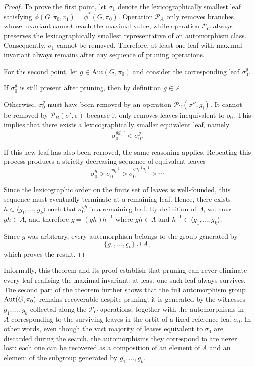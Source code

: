 \begin{proof}
  To prove the first point, let $\sigma_1$ denote the lexicographically smallest leaf satisfying $\phi(G,\pi_0,v_1)=\phi^*(G,\pi_0)$.
  Operation $\mathcal{P}_A$ only removes branches whose invariant cannot reach the maximal value, while operation $\mathcal{P}_C$ always preserves the lexicographically smallest representative of an automorphism class. Consequently, $\sigma_1$ cannot be removed. Therefore, at least one leaf with maximal invariant always remains after any sequence of pruning operations.
  
  For the second point, let $g\in\mathrm{Aut}(G,\pi_0)$ and consider the corresponding leaf $\sigma_0^g$.
  
  If $\sigma_0^g$ is still present after pruning, then by definition $g\in A$.
  
  Otherwise, $\sigma_0^g$ must have been removed by an operation $\mathcal{P}_C(\sigma'',g_i)$. It cannot be removed by $\mathcal{P}_B(\sigma', \sigma)$ because it only removes leaves inequivalent to $\sigma_0$. This implies that there exists a lexicographically smaller equivalent leaf, namely
  \[
  \sigma_0^{gg_i^{-1}}<\sigma_0^g.
  \]
  
  If this new leaf has also been removed, the same reasoning applies. Repeating this process produces a strictly decreasing sequence of equivalent leaves
  \[
  \sigma_0^g >
  \sigma_0^{gg_i^{-1}} >
  \sigma_0^{gg_i^{-1}g_j^{-1}} >
  \cdots
  \]
  
  Since the lexicographic order on the finite set of leaves is well-founded, this sequence must eventually terminate at a remaining leaf. Hence, there exists $h\in\langle g_1,\ldots,g_k\rangle$
  such that $\sigma_0^{gh}$ is a remaining leaf. By definition of $A$, we have $gh\in A$, and therefore $ g=(gh)h^{-1}$ where $gh\in A$ and $h^{-1}\in\langle g_1,\ldots,g_k\rangle$.
  
  Since $g$ was arbitrary, every automorphism belongs to the group generated by
  \[
  \{g_1,\ldots,g_k\}\cup A,
  \]
  which proves the result.
  \end{proof}

Informally, this theorem and its proof establish that pruning can never eliminate every leaf realising the maximal invariant: at least one such leaf always survives. The second part of the theorem further shows that the full automorphism group $\operatorname{Aut}(G,\pi_0)$ remains recoverable despite pruning: it is generated by the witnesses $g_1,\ldots,g_k$ collected along the $\mathcal{P}_C$ operations, together with the automorphisms in $A$ corresponding to the surviving leaves in the orbit of a fixed reference leaf $\sigma_0$. In other words, even though the vast majority of leaves equivalent to $\sigma_0$ are discarded during the search, the automorphisms they correspond to are never lost: each one can be recovered as a composition of an element of $A$ and an element of the subgroup generated by $g_1,\ldots,g_k$.

